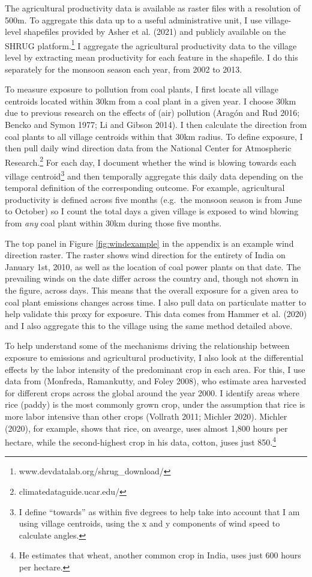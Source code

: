\documentclass[
]{article}
\begin{document}
The agricultural productivity data is available as raster files with a resolution of 500m. To aggregate this data up to a useful administrative unit, I use village-level shapefiles provided by Asher et al. (2021) and publicly available on the SHRUG platform.\footnote{www.devdatalab.org/shrug\_download/} I aggregate the agricultural productivity data to the village level by extracting mean productivity for each feature in the shapefile. I do this separately for the monsoon season each year, from 2002 to 2013.

To measure exposure to pollution from coal plants, I first locate all village centroids located within 30km from a coal plant in a given year. I choose 30km due to previous research on the effects of (air) pollution (Aragón and Rud 2016; Bencko and Symon 1977; Li and Gibson 2014). I then calculate the direction from coal plants to all village centroids within that 30km radius. To define exposure, I then pull daily wind direction data from the National Center for Atmospheric Research.\footnote{climatedataguide.ucar.edu/} For each day, I document whether the wind is blowing towards each village centroid\footnote{I define ``towards'' as within five degrees to help take into account that I am using village centroids, using the x and y components of wind speed to calculate angles.} and then temporally aggregate this daily data depending on the temporal definition of the corresponding outcome. For example, agricultural productivity is defined across five months (e.g.~the monsoon season is from June to October) so I count the total days a given village is exposed to wind blowing from \emph{any} coal plant within 30km during those five months.

The top panel in Figure \ref{fig:windexample} in the appendix is an example wind direction raster. The raster shows wind direction for the entirety of India on January 1st, 2010, as well as the location of coal power plants on that date. The prevailing winds on the date differ across the country and, though not shown in the figure, across days. This means that the overall exposure for a given area to coal plant emissions changes across time. I also pull data on particulate matter to help validate this proxy for exposure. This data comes from Hammer et al. (2020) and I also aggregate this to the village using the same method detailed above.

To help understand some of the mechanisms driving the relationship between exposure to emissions and agricultural productivity, I also look at the differential effects by the labor intensity of the predominant crop in each area. For this, I use data from (Monfreda, Ramankutty, and Foley 2008), who estimate area harvested for different crops across the global around the year 2000. I identify areas where rice (paddy) is the most commonly grown crop, under the assumption that rice is more labor intensive than other crops (Vollrath 2011; Michler 2020). Michler (2020), for example, shows that rice, on avearge, uses almost 1,800 hours per hectare, while the second-highest crop in his data, cotton, juses just 850.\footnote{He estimates that wheat, another common crop in India, uses just 600 hours per hectare.}
\end{document}
